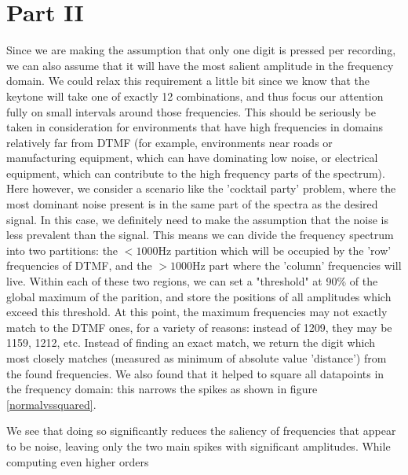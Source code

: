 \documentclass{article}
\begin{document}
\section{Part II}
Since we are making the assumption that only one digit is pressed per recording, we can also assume that it will have the most salient amplitude in the frequency domain.
We could relax this requirement a little bit since we know that the keytone will take one of exactly 12 combinations, and thus focus our attention fully on small intervals around those frequencies.
This should be seriously be taken in consideration for environments that have high frequencies in domains relatively far from DTMF (for example, environments near roads or manufacturing equipment, which can have dominating low noise, or electrical equipment, which can contribute to the high frequency parts of the spectrum).
Here however, we consider a scenario like the 'cocktail party' problem, where the most dominant noise present is in the same part of the spectra as the desired signal.
In this case, we definitely need to make the assumption that the noise is less prevalent than the signal.
This means we can divide the frequency spectrum into two partitions: the $<1000$Hz partition which will be occupied by the 'row' frequencies of DTMF, and the $>1000$Hz part where the 'column' frequencies will live.
Within each of these two regions, we can set a "threshold" at 90\% of the global maximum of the parition, and store the positions of all amplitudes which exceed this threshold.
At this point, the maximum frequencies may not exactly match to the DTMF ones, for a variety of reasons: instead of 1209, they may be 1159, 1212, etc. Instead of finding an exact match, we return the digit which most closely matches (measured as minimum of absolute value 'distance') from the found frequencies.
We also found that it helped to square all datapoints in the frequency domain: this narrows the spikes as shown in figure \ref{normalvssquared}.

We see that doing so significantly reduces the saliency of frequencies that appear to be noise, leaving only the two main spikes with significant amplitudes. While computing even higher orders 
\end{document}
